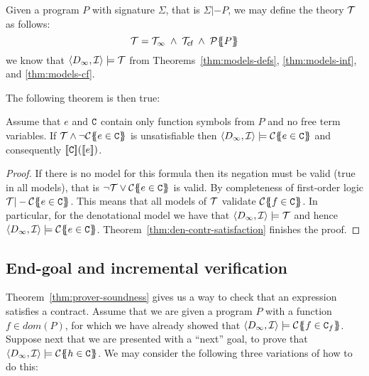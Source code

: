 Given a program $P$ with signature $\Sigma$, that is $\Sigma |- P$, we may define the theory $\Th$ 
as follows:
     \[ \Th = \Th_\infty\;\land\;\Th_\lcfZ\;\land\;\ptrans{}{P} \] 
we know that $\langle D_\infty,{\cal I}\rangle \models \Th$ from 
Theorems~\ref{thm:models-defs}, \ref{thm:models-inf}, and \ref{thm:models-cf}.

The following theorem is then true:

\begin{theorem}[Soundness]\label{thm:prover-soundness}
Assume that $e$ and $\Ct$ contain only function symbols from $P$ and no free term variables. 
If $\Th \land \neg\ctrans{\Sigma}{P}{e \in \Ct}$ is 
unsatisfiable then $\langle D_\infty,{\cal I}\rangle \models \ctrans{\Sigma}{P}{e \in \Ct}$ and 
consequently $\dbrace{\Ct}(\dbrace{e})$.
\end{theorem}
\begin{proof}
If there is no model for this formula then its negation must be valid (true in all models), that 
is $ \neg \Th \lor \ctrans{\Sigma}{P}{e \in \Ct}$ is valid. By completeness
of first-order logic $\Th |- \ctrans{\Sigma}{P}{e \in \Ct}$. This means 
that all models of $\Th$ validate $\ctrans{\Sigma}{P}{f \in \Ct}$. In particular, 
for the denotational model we have that $\langle D_\infty,{\cal I}\rangle \models \Th$ 
and hence $\langle D_\infty,{\cal I} \rangle \models \ctrans{\Sigma}{P}{e \in \Ct}$. 
Theorem~\ref{thm:den-contr-satisfaction} finishes the proof.
\end{proof}

\subsection{End-goal and incremental verification}\label{sect:incremental}

Theorem~\ref{thm:prover-soundness} gives us a way to check that an expression satisfies a 
contract. Assume that we are given a program $P$ with a function $f \in dom(P)$, for which 
we have already showed that $\langle D_\infty,{\cal I}\rangle \models \ctrans{\Sigma}{P}{f \in \Ct_f}$.
Suppose next that we are presented with a ``next'' goal, to prove that 
$\langle D_\infty,{\cal I}\rangle \models \ctrans{\Sigma}{P}{h \in \Ct}$. 
We may consider the following three variations of how to do this:

